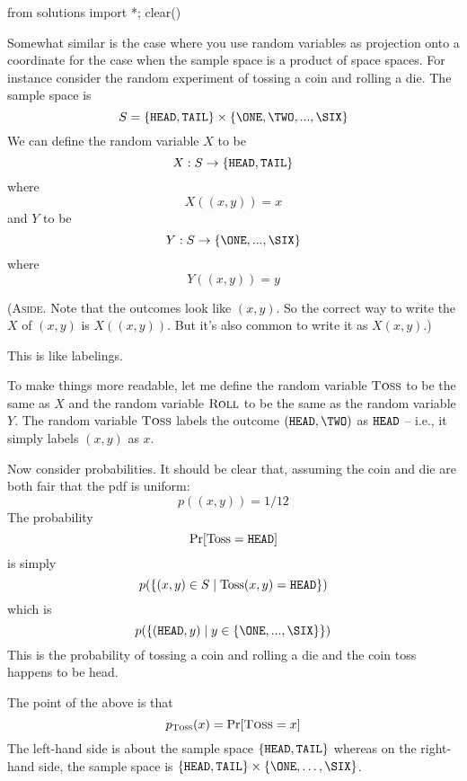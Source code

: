 \begin{python0}
from solutions import *; clear()
\end{python0}

Somewhat similar is the case where you use random variables
as projection onto a coordinate for the case when the
sample space is a product of space spaces.
For instance consider the random experiment of
tossing a coin and rolling a die.
The sample space is
\[
S =
\{\HEAD, \TAIL \}
\times
\{\ONE, \TWO, ..., \SIX \}
\]
We can define the random variable $X$ to be
\[
X : S \rightarrow
\{\texttt{HEAD}, \texttt{TAIL} \}
\]
where
\[
X((x, y)) = x
\]
and $Y$ to be
\[
Y : S \rightarrow
\{\ONE, ..., \SIX \}
\]
where
\[
Y((x, y)) = y
\]

(\textsc{Aside}. Note that the outcomes look like $(x, y)$.
So the correct way to write the $X$ of $(x, y)$ is
$X((x, y))$.
But it's also common to write it as $X(x, y)$.)

This is like labelings.

To make things more readable, let me
define the random variable $\textsc{Toss}$
to be the same as $X$ and the random
variable $\textsc{Roll}$ to be the same
as the random variable $Y$.
The random variable $\textsc{Toss}$ labels
the outcome $(\HEAD, \TWO)$ as $\texttt{HEAD}$ -- i.e., it
simply labels $(x, y)$ as $x$.


Now consider probabilities.
It should be clear that, assuming the coin and die are both fair
that the pdf is uniform:
\[
p((x, y)) = 1/12
\]
The probability
\[
\Pr[\operatorname{Toss} = \texttt{HEAD}]
\]
is simply
\[
p( \{ (x,y) \in S \mid \operatorname{Toss}(x,y) = \texttt{HEAD} \} )
\]
which is
\[
p(\{(\HEAD,y) \mid y \in \{\ONE, ..., \SIX\}\} )
\]
This is the probability of tossing a coin and rolling a die and the
coin toss happens to be  head.



The point of the above is that
\[
p_{\textsc{Toss}}(x) = \Pr[\textsc{Toss} = x]
\]
The left-hand side is about the sample space $\{\texttt{HEAD}, \texttt{TAIL}\}$
whereas on the right-hand side, the sample space is
$\{\HEAD, \TAIL\} \times \{ \ONE, \ldots, \SIX \}$.
